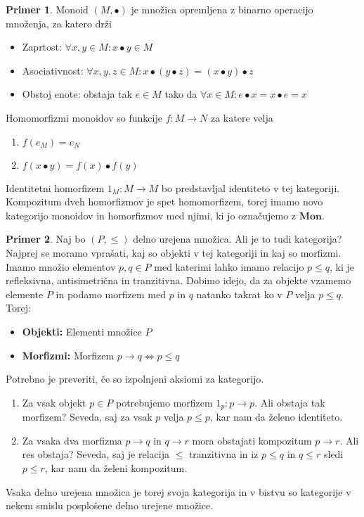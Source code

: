 \documentclass[12pt,a4paper]{book}
\theoremstyle{definition}
\theoremstyle{plain}
\theoremstyle{definition}
\newtheorem{primer}{Primer}[section]
\theoremstyle{remark}
\newcommand{\cat}[1]{\textbf{#1}}
\begin{document}
\begin{primer}
Monoid $(M, \bullet)$ je množica opremljena z binarno operacijo množenja, za katero drži
\begin{itemize}
\item Zaprtost: $\forall x,y \in M : x \bullet y \in M$
\item Asociativnost: $\forall x,y,z \in M : x \bullet ( y \bullet z ) = ( x \bullet y ) \bullet z$
\item Obstoj enote: obstaja tak $e \in M$ tako da $\forall x \in M : e \bullet x = x \bullet e = x$
\end{itemize}
Homomorfizmi monoidov so funkcije $f : M \to N$ za katere velja
\begin{enumerate}
\item $f(e_M) = e_N$
\item $f(x \bullet y) = f(x) \bullet f(y)$
\end{enumerate}
Identitetni homorfizem $1_M : M \to M$ bo predstavljal identiteto v tej kategoriji. Kompozitum dveh homorfizmov je spet homomorfizem, torej imamo novo kategorijo monoidov in homorfizmov med njimi, ki jo označujemo z $\cat{Mon}$.
\end{primer}

\begin{primer}
Naj bo $(P, \leq)$ delno urejena množica. Ali je to tudi kategorija? Najprej se moramo vprašati, kaj so objekti v tej kategoriji in kaj so morfizmi.
Imamo množio elementov $p,q \in P$ med katerimi lahko imamo relacijo $p \leq q$, ki je refleksivna, antisimetrična in tranzitivna. Dobimo idejo, da za objekte vzamemo elemente $P$ in podamo morfizem med $p$ in $q$ natanko takrat ko v $P$ velja $p \leq q$.
Torej: 
\begin{itemize}
\item \textbf{Objekti:} Elementi množice $P$
\item \textbf{Morfizmi:} Morfizem $p \rightarrow q \Leftrightarrow p \leq q$
\end{itemize}
Potrebno je preveriti, če so izpolnjeni aksiomi za kategorijo.

\begin{enumerate}
\item Za vsak objekt $p \in P$ potrebujemo morfizem $1_p : p \to p$. Ali obstaja tak morfizem? Seveda, saj za vsak $p$ velja $p \leq p$, kar nam da želeno identiteto.
\item Za vsaka dva morfizma $p \to q$ in $q \to r$ mora obstajati kompozitum $p \to r$. Ali res obstaja? Seveda, saj je relacija $\leq$ tranzitivna in iz $p \leq q$ in $q \leq r$ sledi $p \leq r$, kar nam da želeni kompozitum.
\end{enumerate}
Vsaka delno urejena množica je torej svoja kategorija in v bistvu so kategorije v nekem smislu posplošene delno urejene množice.
\end{primer}
\end{document}
